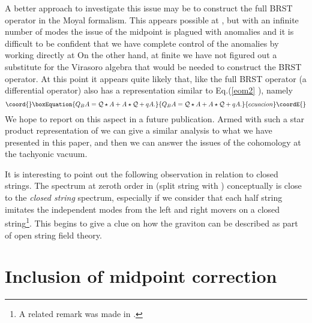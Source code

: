 \documentclass[a4paper,aps,preprint,nofootinbib,eqsecnum]{revtex4}
\begin{document}
A better approach to investigate this issue may be to construct the full
BRST operator in the Moyal formalism. This appears possible at \coordHE{},
but with an infinite number of modes the issue of the midpoint is plagued
with anomalies and it is difficult to be confident that we have complete
control of the anomalies by working directly at \coordHE{} On the other
hand, at finite \coordHE{} we have not figured out a substitute for the Virasoro
algebra that would be needed to construct the BRST operator. At this point
it appears quite likely that, like \coordHE{} the full BRST operator \coordHE{}
(a differential operator) also has a representation similar to Eq.(\ref{eom2}%
), namely%
\begin{equation}\coord{}\boxEquation{
Q_{B}A=\mathcal{Q}\star A+A\star \mathcal{Q}+qA.
}{
Q_{B}A=\mathcal{Q}\star A+A\star \mathcal{Q}+qA.
}{ecuacion}\coordE{}\end{equation}%
We hope to report on this aspect in a future publication. Armed with such a
star product representation of \coordHE{} we can give a similar analysis to
what we have presented in this paper, and then we can answer the issues of
the cohomology at the tachyonic vacuum.

It is interesting to point out the following observation in relation to
closed strings. The spectrum at zeroth order in \myHighlight{$\gamma $}\coordHE{} (split string with
\coordHE{}) conceptually is close to the \emph{closed string}
spectrum, especially if we consider that each half string imitates the
independent modes from the left and right movers on a closed string\footnote{%
A related remark was made in \cite{Moore-Taylor}.}. This begins to give a
clue on how the graviton can be described as part of open string field
theory.

\section{Inclusion of midpoint correction}
\end{document}
